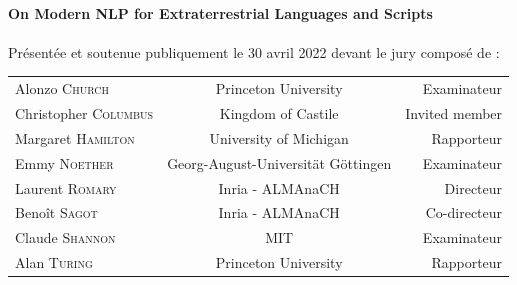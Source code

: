 \begin{titlepage}
\begin{center}
		\hrulefill\\[0.2cm]

		{\Large  \textbf{On Modern NLP for Extraterrestrial Languages and Scripts}}\\[0.1cm]

		\hrulefill\\

		\vspace{0.cm}
		\normalsize Présentée et soutenue publiquement le 30 avril 2022 devant le jury composé de :\\
		\vspace{0.4cm}
		\begin{tabular*}{\linewidth}{l c r}
			Alonzo \textsc{Church} & Princeton University & Examinateur \\
			Christopher \textsc{Columbus} & Kingdom of Castile & Invited member\\
			Margaret \textsc{Hamilton} & University of Michigan & Rapporteur \\
			Emmy \textsc{Noether} & Georg-August-Universität Göttingen & Examinateur \\
			Laurent \textsc{Romary} & Inria - ALMAnaCH & Directeur\\
			Benoît \textsc{Sagot} & Inria - ALMAnaCH & Co-directeur\\
			Claude \textsc{Shannon} & MIT & Examinateur \\
			Alan \textsc{Turing} & Princeton University & Rapporteur \\
		\end{tabular*}
	\end{center}

\end{titlepage}


\newpage
\null
\thispagestyle{empty}
\newpage
